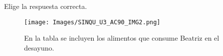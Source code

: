 Elige la respuesta correcta.
\begin{figure}[H]
    \centering
    \texttt{[image: Images/SINQU\_U3\_AC90\_IMG2.png]}
    \caption{En la tabla se incluyen los alimentos que consume Beatriz en el desayuno.}
\end{figure}
\begin{parts}
    
    
    
    
    
\end{parts}
